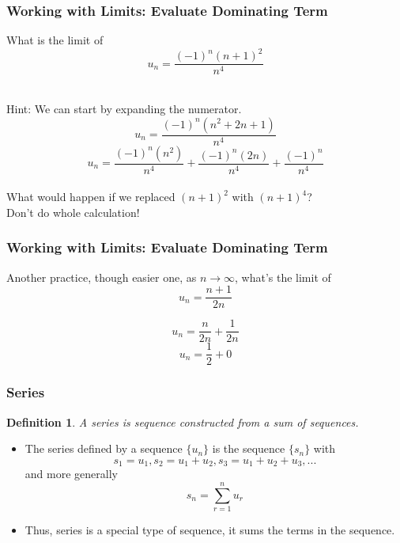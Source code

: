 \documentclass{beamer}
\newtheorem{defn}{Definition}
\numberwithin{equation}{section}
\begin{document}







\begin{frame}
\frametitle{Working with Limits: Evaluate Dominating Term}

What is the limit of 
$$ u_{n} = \frac{(-1)^n (n+1)^2}{n^4} $$

\ \\Hint: We can start by expanding the numerator. \pause
$$ u_{n} = \frac{(-1)^n (n^2+2n+1)}{n^4} $$\pause
$$ u_{n} = \frac{(-1)^n (n^2)}{n^4}+\frac{(-1)^n (2n)}{n^4}+\frac{(-1)^n}{n^4} $$\pause
\ \\What would happen if we replaced $(n+1)^2$ with $(n+1)^4$?  \\Don't do whole calculation! \pause
\end{frame}






\begin{frame}
\frametitle{Working with Limits: Evaluate Dominating Term}
Another practice, though easier one, as $n\rightarrow \infty$, what's the limit of 
$$ u_{n} = {\frac{n+1}{2n}} $$\pause

$$ u_{n} = \frac{n}{2n}+\frac{1}{2n} $$\pause
$$ u_{n} = \frac{1}{2}+0 $$


\end{frame}



\begin{frame}
\frametitle{Series}
\begin{defn}
A \alert{series} is sequence constructed from a sum of sequences.
\end{defn} \pause
\begin{itemize}
\item The series defined by a sequence $\{u_n\}$ is the sequence $\{s_n\}$ with $$s_1=u_1, s_2=u_1+u_2, s_3=u_1+u_2+u_3, ...$$ and more generally $$s_n=\sum_{r=1}^{n}u_r$$ \pause

\item Thus, series is a special type of sequence, it sums the terms in the sequence.
\end{itemize}

\end{frame}
\end{document}

